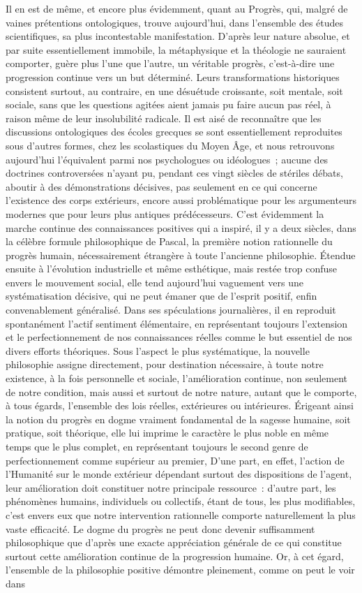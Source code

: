 \documentclass[french,twoside]{book} %
\begin{document}
Il en est de même, et encore plus évidemment, quant au Progrès, qui, malgré de vaines prétentions ontologiques, trouve aujourd’hui, dans l’ensemble des études scientifiques, sa plus incontestable manifestation. D’après leur nature absolue, et par suite essentiellement immobile, la métaphysique et la théologie ne sauraient comporter, guère plus l’une que l’autre, un véritable progrès, c’est-à-dire une progression continue vers un but déterminé. Leurs transformations historiques consistent surtout, au contraire, en une désuétude croissante, soit mentale, soit sociale, sans que les questions agitées aient jamais pu faire aucun pas réel, à raison même de leur insolubilité radicale. Il est aisé de reconnaître que les discussions ontologiques des écoles grecques se sont essentiellement reproduites sous d’autres formes, chez les scolastiques du Moyen Âge, et nous retrouvons aujourd’hui l’équivalent parmi nos psychologues ou idéologues ; aucune des doctrines controversées n’ayant pu, pendant ces vingt siècles de stériles débats, aboutir à des démonstrations décisives, pas seulement en ce qui concerne l’existence des corps extérieurs, encore aussi problématique pour les argumenteurs modernes que pour leurs plus antiques prédécesseurs. C’est évidemment la marche continue des connaissances positives qui a inspiré, il y a deux siècles, dans la célèbre formule philosophique de Pascal, la première notion rationnelle du progrès humain, nécessairement étrangère à toute l’ancienne philosophie. Étendue ensuite à l’évolution industrielle et même esthétique, mais restée trop confuse envers le mouvement social, elle tend aujourd’hui vaguement vers une systématisation décisive, qui ne peut émaner que de l’esprit positif, enfin convenablement généralisé. Dans ses spéculations journalières, il en reproduit spontanément l’actif sentiment élémentaire, en représentant toujours l’extension et le perfectionnement de nos connaissances réelles comme le but essentiel de nos divers efforts théoriques. Sous l’aspect le plus systématique, la nouvelle philosophie assigne directement, pour destination nécessaire, à toute notre existence, à la fois personnelle et sociale, l’amélioration continue, non seulement de notre condition, mais aussi et surtout de notre nature, autant que le comporte, à tous égards, l’ensemble des lois réelles, extérieures ou intérieures. Érigeant ainsi la notion du progrès en dogme vraiment fondamental de la sagesse humaine, soit pratique, soit théorique, elle lui imprime le caractère le plus noble en même temps que le plus complet, en représentant toujours le second genre de perfectionnement comme supérieur au premier, D’une part, en effet, l’action de l’Humanité sur le monde extérieur dépendant surtout des dispositions de l’agent, leur amélioration doit constituer notre principale ressource : d’autre part, les phénomènes humains, individuels ou collectifs, étant de tous, les plus modifiables, c’est envers eux que notre intervention rationnelle comporte naturellement la plus vaste efficacité. Le dogme du progrès ne peut donc devenir suffisamment philosophique que d’après une exacte appréciation générale de ce qui constitue surtout cette amélioration continue de la progression humaine. Or, à cet égard, l’ensemble de la philosophie positive démontre pleinement, comme on peut le voir dans 
\end{document}
